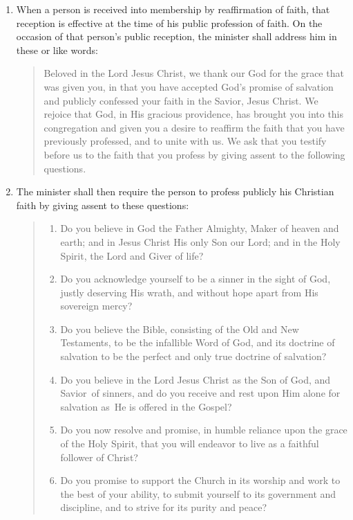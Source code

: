 \documentclass[
]{book}
\providecommand{\tightlist}{%
  \setlength{\itemsep}{0pt}\setlength{\parskip}{0pt}}
\begin{document}
\protect\hypertarget{chapter-slug-66-reception-by-reaffirmation-of-faith}{\href{}{}}

\begin{enumerate}
\def\labelenumi{\arabic{enumi}.}
\item
  \protect\hypertarget{66}{\href{}{}}When a person is received into membership by reaffirmation of faith, that reception is effective at the time of his public profession of faith. On the occasion of that person's public reception, the minister shall address him in these or like words:

  \begin{quote}
  Beloved in the Lord Jesus Christ, we thank our God for the grace that was given you, in that you have accepted God's promise of salvation and publicly confessed your faith in the Savior, Jesus Christ. We rejoice that God, in His gracious providence, has brought you into this congregation and given you a desire to reaffirm the faith that you have previously professed, and to unite with us. We ask that you testify before us to the faith that you profess by giving assent to the following questions.
  \end{quote}
\item
  The minister shall then require the person to profess publicly his Christian faith by giving assent to these questions:

  \begin{quote}
  \begin{enumerate}
  \def\labelenumii{(\arabic{enumii})}
  \tightlist
  \item
    Do you believe in God the Father Almighty, Maker of heaven and earth; and in Jesus Christ His only Son our Lord; and in the Holy Spirit, the Lord and Giver of life?
  \item
    Do you acknowledge yourself to be a sinner in the sight of God, justly deserving His wrath, and without hope apart from His sovereign mercy?
  \item
    Do you believe the Bible, consisting of the Old and New Testaments, to be the infallible Word of God, and its doctrine of salvation to be the perfect and only true doctrine of salvation?
  \item
    Do you believe in the Lord Jesus Christ as the Son of God, and Savior~of sinners, and do you receive and rest upon Him alone for salvation as~He is offered in the Gospel?
  \item
    Do you now resolve and promise, in humble reliance upon the grace of the Holy Spirit, that you will endeavor to live as a faithful follower of Christ?
  \item
    Do you promise to support the Church in its worship and work to the best of your ability, to submit yourself to its government and discipline, and to strive for its purity and peace?
  \end{enumerate}
  \end{quote}


\end{enumerate}
\end{document}
